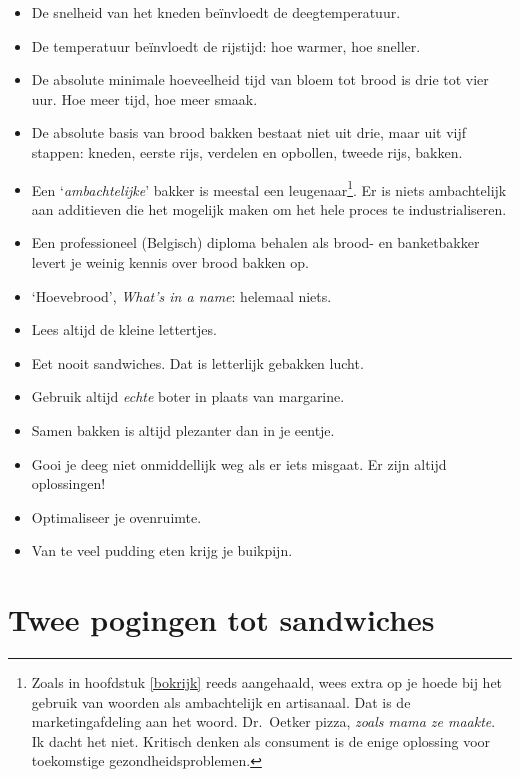 \documentclass[
  11pt,
  dutch,
]{memoir}
\providecommand{\tightlist}{%
  \setlength{\itemsep}{0pt}\setlength{\parskip}{0pt}}
\begin{document}
\begin{itemize}
\tightlist
\item
  De snelheid van het kneden beïnvloedt de deegtemperatuur.
\item
  De temperatuur beïnvloedt de rijstijd: hoe warmer, hoe sneller.
\item
  De absolute minimale hoeveelheid tijd van bloem tot brood is drie tot
  vier uur. Hoe meer tijd, hoe meer smaak.
\item
  De absolute basis van brood bakken bestaat niet uit drie, maar uit
  vijf stappen: kneden, eerste rijs, verdelen en opbollen, tweede rijs,
  bakken.
\item
  Een `\emph{ambachtelijke}' bakker is meestal een leugenaar\footnote{Zoals
    in hoofdstuk \ref{bokrijk} reeds aangehaald, wees extra op je hoede
    bij het gebruik van woorden als ambachtelijk en artisanaal. Dat is
    de marketingafdeling aan het woord. Dr.~Oetker pizza, \emph{zoals
    mama ze maakte}. Ik dacht het niet. Kritisch denken als consument is
    de enige oplossing voor toekomstige gezondheidsproblemen.}. Er is
  niets ambachtelijk aan additieven die het mogelijk maken om het hele
  proces te industrialiseren.
\item
  Een professioneel (Belgisch) diploma behalen als brood- en
  banketbakker levert je weinig kennis over brood bakken op.
\item
  `Hoevebrood', \emph{What's in a name}: helemaal niets.
\item
  Lees altijd de kleine lettertjes.
\item
  Eet nooit sandwiches. Dat is letterlijk gebakken lucht.
\item
  Gebruik altijd \emph{echte} boter in plaats van margarine.
\item
  Samen bakken is altijd plezanter dan in je eentje.
\item
  Gooi je deeg niet onmiddellijk weg als er iets misgaat. Er zijn altijd
  oplossingen!
\item
  Optimaliseer je ovenruimte.
\item
  Van te veel pudding eten krijg je buikpijn.
\end{itemize}

\newpage

\hypertarget{twee-pogingen-tot-sandwiches}{%
\section{Twee pogingen tot
sandwiches}\label{twee-pogingen-tot-sandwiches}}
\end{document}
